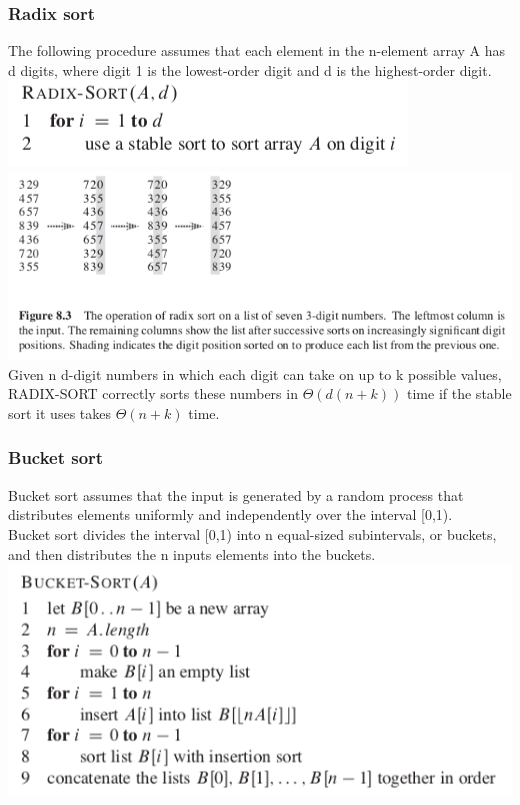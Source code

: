 \documentclass[11pt]{article}
\begin{document}
\subsubsection{Radix sort}
\label{sec-3-3-2}
The following procedure assumes that each element in the n-element array A has d digits, where digit 1 is the lowest-order digit and d is the highest-order digit. \\

\includegraphics[width=.9\linewidth]{pics/c8_radix_sort.png} \\

\includegraphics[width=.9\linewidth]{pics/c8_radix_sort_fig.png} \\

Given n d-digit numbers in which each digit can take on up to k possible values, RADIX-SORT correctly sorts these numbers in $\Theta(d(n+k))$ time if the stable sort it uses takes $\Theta(n+k)$ time. \\

\subsubsection{Bucket sort}
\label{sec-3-3-3}
Bucket sort assumes that the input is generated by a random process that distributes elements uniformly and independently over the interval [0,1). \\
Bucket sort divides the interval [0,1) into n equal-sized subintervals, or buckets, and then distributes the n inputs elements into the buckets. \\

\includegraphics[width=.9\linewidth]{pics/c8_bucket_sort.png} \\
\end{document}
